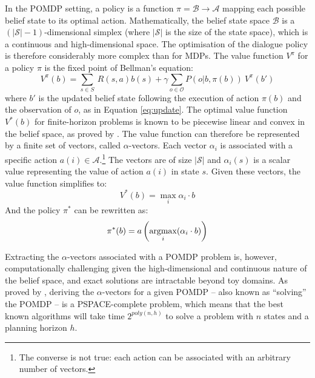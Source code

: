 In the POMDP setting, a policy is a function $\pi = \mathcal{B} \rightarrow \mathcal{A}$ mapping each possible belief state to its optimal action.  Mathematically, the belief state space $\mathcal{B}$ is a $(|\mathcal{S}|\!-\!1)$-dimensional simplex (where $|\mathcal{S}|$ is the size of the state space), which is a continuous and high-dimensional space. The optimisation of the dialogue policy is therefore considerably more complex than for MDPs. The value function $V^{\pi}$ for a policy $\pi$ is the fixed point of Bellman's equation: 
\begin{equation}
V^{\pi}(b) = \sum_{s \in S} \ R(s,a) b(s) + \gamma \sum_{o \in \mathcal{O}} P(o|b,\pi(b)) \ V^{\pi}(b')
\end{equation}
where $b'$ is the updated belief state following the execution of action $\pi(b)$ and the observation of $o$, as in Equation \eqref{eq:update}.  The optimal value function $V^*(b)$ for finite-horizon problems is known to be piecewise linear and convex in the belief space, as proved by \cite{Sondik1971}. The value function can therefore be represented by a finite set of vectors, called $\alpha$-vectors. Each vector $\alpha_i$ is associated with a specific action $a(i) \in \mathcal{A}$.\footnote{The converse is not true: each action can be associated with an arbitrary number of vectors.}  The vectors are of size $|\mathcal{S}|$ and $\alpha_i(s)$ is a scalar value representing the value of action $a(i)$ in state $s$.  Given these vectors, the value function simplifies to:
\begin{equation}
V^*(b) = \max_{i} \alpha_i \cdot b
\end{equation}
And the policy $\pi^*$ can be rewritten as:
\begin{equation}
\pi^*(b) = a\left(\argmax_i(\alpha_i \cdot b)\right)
\end{equation}

Extracting the $\alpha$-vectors associated with a POMDP problem is, however, computationally challenging given the high-dimensional and continuous nature of the belief space, and exact solutions are intractable beyond toy domains. As proved by \cite{Papadimitriou:1987}, deriving the $\alpha$-vectors for a given POMDP -- also known as ``solving'' the POMDP -- is a PSPACE-complete problem, which means that the best known algorithms will take time $2^{poly(n,h)}$ to solve a problem with $n$ states and a planning horizon $h$.

